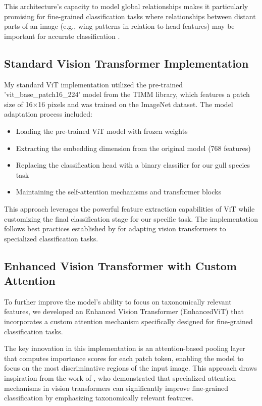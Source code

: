 \documentclass[a4paper,12pt]{article}
\begin{document}
This architecture's capacity to model global relationships makes it particularly promising for fine-grained classification tasks where relationships between distant parts of an image (e.g., wing patterns in relation to head features) may be important for accurate classification \citep{conde2021exploring}.

\subsection{Standard Vision Transformer Implementation}

My standard ViT implementation utilized the pre-trained 'vit\_base\_patch16\_224' model from the TIMM library, which features a patch size of 16$\times$16 pixels and was trained on the ImageNet dataset. The model adaptation process included:

\begin{itemize}
    \item Loading the pre-trained ViT model with frozen weights
    \item Extracting the embedding dimension from the original model (768 features)
    \item Replacing the classification head with a binary classifier for our gull species task
    \item Maintaining the self-attention mechanisms and transformer blocks
\end{itemize}

This approach leverages the powerful feature extraction capabilities of ViT while customizing the final classification stage for our specific task. The implementation follows best practices established by \citep{wightman2021resnet} for adapting vision transformers to specialized classification tasks.

\subsection{Enhanced Vision Transformer with Custom Attention}

To further improve the model's ability to focus on taxonomically relevant features, we developed an Enhanced Vision Transformer (EnhancedViT) that incorporates a custom attention mechanism specifically designed for fine-grained classification tasks.

The key innovation in this implementation is an attention-based pooling layer that computes importance scores for each patch token, enabling the model to focus on the most discriminative regions of the input image. This approach draws inspiration from the work of \citep{guan2022attention}, who demonstrated that specialized attention mechanisms in vision transformers can significantly improve fine-grained classification by emphasizing taxonomically relevant features.
\end{document}
